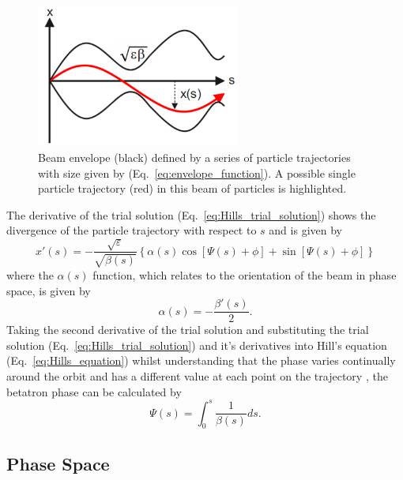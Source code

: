 \documentclass[../main.tex]{subfiles}
\begin{document}
\begin{figure}[!h]
\centering
\includegraphics[width=0.6\textwidth]{Figures/Energy_Recovery_Linac_Design/Beam_Envelope_fixed.pdf}
\caption{Beam envelope (black) defined by a series of particle trajectories with size given by (Eq.~\ref{eq:envelope_function}). A possible single particle trajectory (red) in this beam of particles is highlighted.}
\label{fig:beam_envelope}
\end{figure}

The derivative of the trial solution (Eq.~\ref{eq:Hills_trial_solution}) shows the divergence of the particle trajectory with respect to $s$ and is given by
\begin{equation}
x'\left(s\right) = -\frac{\sqrt{\varepsilon}}{\sqrt{\beta\left(s\right)}}\left\{\alpha\left(s\right)\cos\left[\Psi\left(s\right)+\phi\right]+\sin\left[\Psi\left(s\right)+\phi\right]\right\}
\label{eq:Hills_trial_solution_derivative}    
\end{equation}
where the $\alpha\left(s\right)$ function, which relates to the orientation of the beam in phase space, is given by
\begin{equation}
\alpha\left(s\right) = -\frac{\beta'\left(s\right)}{2}.
\label{eq:alpha_function}    
\end{equation}
Taking the second derivative of the trial solution and substituting the trial solution (Eq.~\ref{eq:Hills_trial_solution}) and it's derivatives into Hill's equation (Eq.~\ref{eq:Hills_equation}) whilst understanding that the phase varies continually around the orbit and has a different value at each point on the trajectory \cite{wille2000physics}, the betatron phase can be calculated by
\begin{equation}
\Psi\left(s\right) = \int_{0}^{s}\frac{1}{\beta\left(s\right)}ds.
\label{eq:betatron_phase}    
\end{equation}

\subsection{Phase Space}
\end{document}
